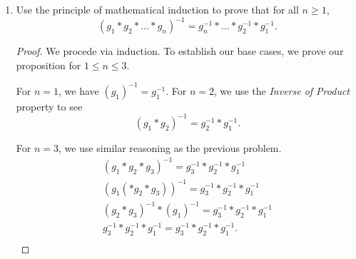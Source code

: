 \documentclass{article}
\begin{document}
\begin{enumerate}
{\begin{proof}
            By reapplying the \emph{Inverse of Product} property, we write
            \begin{align*}
                (g \times g)^{-1} \times g^{-1} &= g^{-1} \times g^{-1} \times g^{-1} \\
                g^{-1} \times g^{-1} \times g^{-1} &= g^{-1} \times g^{-1} \times g^{-1}. \\
            \end{align*}

            Now, we can make our inductive hypothesis: That \((g^k)^{-1} = (g^{-1})^k\)
            for \(k \le n\). 
            
            To prove that our proposition holds for \(k +1\), we use 
            \emph{associativity} to ``pull appart''the LHS expression to get 
            \begin{align*}
                (g^{k+1})^{-1} &= (g^{-1})^{k+1} \\
                (g \times g^k)^{-1} &= (g^{-1})^{k+1} \\
                (g^k)^{-1} \times g^{-1} &= (g^{-1})^{k+1} \\
                (g^{-1})^k \times g^{-1} &= (g^{-1})^{k+1} \\
                (g^{-1})^{k+1} &= (g^{-1})^{k+1}.
            \end{align*}

            Therefore, for all \(k \geq 1\),
            \[(g^k)^{-1} = (g^{-1})^k.\]
        \end{proof}
    }

    \item {
        Use the principle of mathematical induction to prove that for all \(n \geq 1\),
      \[         (g_1 * g_2 * \dots * g_n)^{-1} = g_n^{-1} * \dots * g_2^{-1} * g_1^{-1}.      \]

      \begin{proof}
        We procede via induction. To establish our base cases, we prove our proposition
        for \(1 \le n \le 3\). 

        For \(n = 1\), we have \((g_1)^{-1} = g_1^{-1}\).
        For \(n = 2\), we use the \emph{Inverse of Product} property to see 
        \[ (g_1 * g_2)^{-1} = g_2^{-1} * g_1^{-1}. \]

        For \(n = 3\), we use similar reasoning as the previous problem.
        \begin{align*}
            (g_1 * g_2 * g_3)^{-1} = g_3^{-1} * g_2^{-1} * g_1^{-1} \\
            (g_1 (* g_2 * g_3))^{-1} = g_3^{-1} * g_2^{-1} * g_1^{-1} \\
            (g_2 * g_3)^{-1} * (g_1 )^{-1} = g_3^{-1} * g_2^{-1} * g_1^{-1} \\
            g_3^{-1} * g_2^{-1} * g_1^{-1} = g_3^{-1} * g_2^{-1} * g_1^{-1}. \\
        \end{align*}


\end{proof}}
\end{enumerate}
\end{document}
